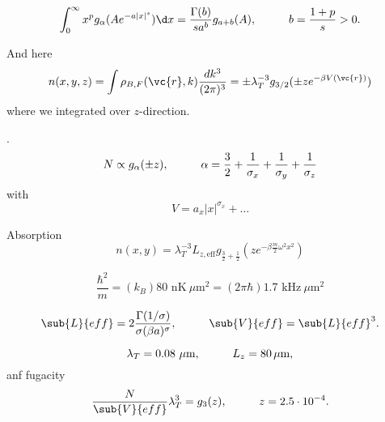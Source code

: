 \begin{equation*}
	\int_{0}^{\infty}  x^p g_\alpha(A e^{- a |x|^s})
	\d x = \frac{\Gamma(b)}{s a^b} g_{a+b}(A),
	\hspace{10 mm} 
	b =  \frac{1+p}{s} > 0.
\end{equation*}


And here
\begin{equation*}
	n(x,y,z) = \int \rho_{B,F}(\vc{r},k) \frac{d k^3}{(2\pi)^3} = \pm \lambda_T^{-3} g_{3/2} (\pm z e^{- \beta V(\vc{r})})
\end{equation*}
where we integrated over $z$-direction. 


.
\begin{equation*}
	N \propto g_{\alpha}(\pm z),
	\hspace{10 mm} 
	\alpha = \frac{3}{2} + \frac{1}{\sigma_x} + \frac{1}{\sigma_y} + \frac{1}{\sigma_z}
\end{equation*}
with
\begin{equation*}
	V = a_x |x|^{\sigma_x} + \ldots
\end{equation*}


Absorption
\begin{equation*}
	n(x,y) = \lambda_T^{-3} L_{z, \text{eff}} g_{\frac{3}{2}+\frac{1}{2}} (z e^{- \beta \frac{m}{2} \omega^2 x^2})
\end{equation*}

\begin{equation*}
	\frac{\hbar^2}{m} = (k_B) 80 \text{ nK} \ \mu\text{m}^2 = (2\pi \hbar) 1.7  \text{ kHz} \ \mu\text{m}^2
\end{equation*}

\begin{equation*}
	\sub{L}{eff} = 2 \frac{\Gamma(1/\sigma)}{\sigma (\beta a)^\sigma},
	\hspace{10 mm} 
	\sub{V}{eff} = \sub{L}{eff}^3.
\end{equation*}

\begin{equation*}
	\lambda_T = 0.08\ \mu\text{m},
	\hspace{10 mm} 
	L_z = 80 \, \mu\text{m},
\end{equation*}
anf fugacity
\begin{equation*}
	\frac{N}{\sub{V}{eff}} \lambda_T^3 = g_3 (z),
	\hspace{10 mm} 
	z = 2.5 \cdot 10^{-4}.
\end{equation*}

